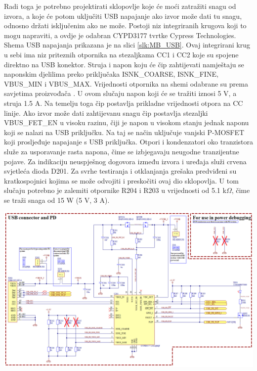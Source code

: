 Radi toga je potrebno projektirati sklopovlje koje će moći zatražiti snagu od izvora, a koje će potom uključiti USB napajanje ako izvor može dati tu snagu, odnosno držati isključenim ako ne može. Postoji niz integriranih krugova koji to mogu napraviti, a ovdje je odabran CYPD3177 tvrtke Cypress Technologies. Shema USB napajanja prikazana je na slici \ref{slk:MB_USB}. Ovaj integrirani krug u sebi ima niz priteznih otpornika na stezaljkama CC1 i CC2 koje su spojene direktno na USB konektor. Struja i napon koju će čip zahtijevati namještaju se naponskim djelilima preko priključaka ISNK\_COARSE, ISNK\_FINE, VBUS\_MIN i VBUS\_MAX. Vrijednosti otpornika na shemi odabrane su prema savjetima proizvođača \cite{ct:usb}. U ovom slučaju napon koji će se tražiti iznosi 5 V, a struja 1.5 A. Na temelju toga čip postavlja prikladne vrijednosti otpora na CC linije. Ako izvor može dati zahtijevanu snagu čip postavlja stezaljki VBUS\_FET\_EN u visoku razinu, čiji je napon u visokom stanju jednak naponu koji se nalazi na USB priključku. Na taj se način uključuje vanjski P-MOSFET koji prosljeđuje napajanje s USB priključka. Otpori i kondenzatori oko tranzistora služe za usporavanje rasta napona, čime se izbjegavaju neugodne tranzijentne pojave. Za indikaciju neuspješnog dogovora između izvora i uređaja služi crvena svjetleća dioda D201. Za svrhe testiranja i otklanjanja grešaka predviđeni su kratkospojnici kojima se može odvojiti i preskočiti ovaj dio sklopovlja. U tom slučaju potrebno je zalemiti otpornike R204 i R203 u vrijednosti od 5.1 k$\Omega$, čime se traži snaga od 15 W (5 V, 3 A).
\begin{center}
    \begin{sideways}
        \begin{minipage}{1.4\linewidth}
            \includegraphics[width=\linewidth]{Figures/MB_USB.png}
            \label{slk:MB_USB}
        \end{minipage}
    \end{sideways}
\end{center}

